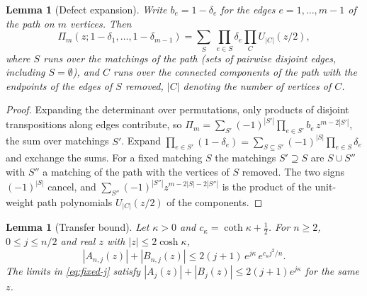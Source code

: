 \documentclass[11pt]{amsart}
\newtheorem{lemma}[theorem]{Lemma}
\theoremstyle{definition}
\theoremstyle{remark}
\numberwithin{equation}{section}
\begin{document}
\begin{lemma}[Defect expansion]\label{lem:defect}
Write $b_e=1-\delta_e$ for the edges $e=1,\dots,m-1$ of the path on $m$ vertices. Then
\[
\Pi_m(z;1-\delta_1,\dots,1-\delta_{m-1})=\sum_{S}\ \prod_{e\in S}\delta_e\prod_{C}U_{|C|}(z/2),
\]
where $S$ runs over the matchings of the path (sets of pairwise disjoint edges, including $S=\emptyset$), and $C$ runs over the connected components of the path with the endpoints of the edges of $S$ removed, $|C|$ denoting the number of vertices of $C$.
\end{lemma}

\begin{proof}
Expanding the determinant over permutations, only products of disjoint transpositions along edges contribute, so $\Pi_m=\sum_{S'}(-1)^{|S'|}\prod_{e\in S'}b_e\,z^{m-2|S'|}$, the sum over matchings $S'$. Expand $\prod_{e\in S'}(1-\delta_e)=\sum_{S\subseteq S'}(-1)^{|S|}\prod_{e\in S}\delta_e$ and exchange the sums. For a fixed matching $S$ the matchings $S'\supseteq S$ are $S\cup S''$ with $S''$ a matching of the path with the vertices of $S$ removed. The two signs $(-1)^{|S|}$ cancel, and $\sum_{S''}(-1)^{|S''|}z^{m-2|S|-2|S''|}$ is the product of the unit-weight path polynomials $U_{|C|}(z/2)$ of the components.
\end{proof}

\begin{lemma}[Transfer bound]\label{lem:transfer}
Let $\kappa>0$ and $c_\kappa=\coth\kappa+\frac12$. For $n\ge2$, $0\le j\le n/2$ and real $z$ with $|z|\le2\cosh\kappa$,
\[
|A_{n,j}(z)|+|B_{n,j}(z)|\le2(j+1)\,e^{j\kappa}\,e^{c_\kappa j^2/n}.
\]
The limits in \eqref{eq:fixed-j} satisfy $|A_j(z)|+|B_j(z)|\le2(j+1)e^{j\kappa}$ for the same $z$.
\end{lemma}
\end{document}
